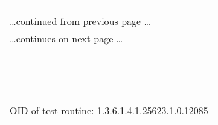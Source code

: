 \documentclass{article}
\begin{document}
\begin{longtable}{|p{}|}
\hline
\rowcolor{openvas_hole}{\color{white}{High (CVSS: 6.8) }}\\
\rowcolor{openvas_hole}{\color{white}{NVT: Apache Tomcat servlet/JSP container default files}}\\
\hline
\endfirsthead
\hfill\ldots continued from previous page \ldots \\
\hline
\endhead
\hline
\ldots continues on next page \ldots \\
\endfoot
\hline
\endlastfoot
\\
\rowcolor{white}{\verb=Default files, such as documentation, default Servlets and JSPs were found on =}\\
\rowcolor{white}{\verb=the Apache Tomcat servlet/JSP container.  =}\\
\rowcolor{white}{\verb=Remove default files, example JSPs and Servlets from the Tomcat=}\\
\rowcolor{white}{\verb=Servlet/JSP container.=}\\
\rowcolor{white}{\verb=These files should be removed as they may help an attacker to guess the=}\\
\rowcolor{white}{\verb=exact version of Apache Tomcat which is running on this host and may provide =}\\
\rowcolor{white}{\verb=other useful information.=}\\
\rowcolor{white}{\verb=The following default files were found :=}\\
\rowcolor{white}{\verb=/examples/servlets/index.html=}\\
\rowcolor{white}{\verb=/examples/jsp/snp/snoop.jsp=}\\
\rowcolor{white}{\verb=/examples/jsp/index.html=}\\
\rowcolor{white}{\verb==}\\
\rowcolor{white}{\verb==}\\
\\
OID of test routine: 1.3.6.1.4.1.25623.1.0.12085\\
\end{longtable}
\end{document}
